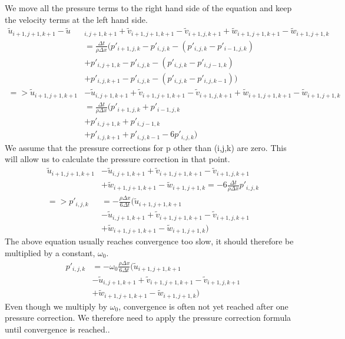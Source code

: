 \documentclass{article}
\begin{document}
We move all the pressure terms to the right hand side of the equation and keep the velocity terms at the left hand side.
\[
  \begin{split}
    \tilde{u}_{i+1,j+1,k+1}-\tilde{u}&_{i, j+1, k+1}
    +\tilde{v}_{i+1,j+1,k+1}-\tilde{v}_{i+1, j, k+1}
    +\tilde{w}_{i+1,j+1,k+1}
    -\tilde{w}_{i+1, j+1, k}\\
    &=\frac{\Delta t}{\rho \Delta x}(p'_{i+1,j,k}-p'_{i,j,k} - (p'_{i,j,k}-p'_{i-1,j,k})\\
    &+p'_{i,j+1,k}-p'_{i,j,k}-(p'_{i,j,k}-p'_{i,j-1,k})\\
    &+p'_{i,j,k+1}-p'_{i,j,k}- (p'_{i,j,k}-p'_{i,j,k-1}))\\
    =>\tilde{u}_{i+1,j+1,k+1}&-\tilde{u}_{i, j+1, k+1}
    +\tilde{v}_{i+1,j+1,k+1}-\tilde{v}_{i+1, j, k+1}
    +\tilde{w}_{i+1,j+1,k+1}
    -\tilde{w}_{i+1, j+1, k}\\
    &=\frac{\Delta t}{\rho \Delta x}(p'_{i+1,j,k} + p'_{i-1,j,k}\\
    &+p'_{i,j+1,k}+p'_{i,j-1,k}\\
    &+p'_{i,j,k+1}+p'_{i,j,k-1} - 6 p'_{i,j,k})
  \end{split}
\]
We assume that the pressure corrections for p other than (i,j,k) are zero. This will allow us to calculate the pressure correction in that point.\cite{MAC}
\[
  \begin{split}
  \tilde{u}_{i+1,j+1,k+1}&-\tilde{u}_{i, j+1, k+1}
    +\tilde{v}_{i+1,j+1,k+1}-\tilde{v}_{i+1, j, k+1}
    \\ &+\tilde{w}_{i+1,j+1,k+1}
    -\tilde{w}_{i+1, j+1, k}
     =-6\frac{\Delta t}{\rho \Delta x}p'_{i,j,k}\\
      =>p'_{i,j,k}&=-\frac{\rho \Delta x}{6\Delta t}(\tilde{u}_{i+1,j+1,k+1} \\ &-\tilde{u}_{i, j+1, k+1}
    +\tilde{v}_{i+1,j+1,k+1}-\tilde{v}_{i+1, j, k+1}
    \\ &+\tilde{w}_{i+1,j+1,k+1}
    -\tilde{w}_{i+1, j+1, k})
  \end{split}
\]
The above equation usually reaches convergence too slow, it should therefore be multiplied by a constant, \(\omega _0\).
\begin{equation}
\begin{split}
  p'_{i,j,k}&=-\omega _0\frac{\rho \Delta x}{6\Delta t}(\tilde{u}_{i+1,j+1,k+1}
  \\ &-\tilde{u}_{i, j+1, k+1}
  +\tilde{v}_{i+1,j+1,k+1}-\tilde{v}_{i+1, j, k+1}
  \\ &+\tilde{w}_{i+1,j+1,k+1}
  -\tilde{w}_{i+1, j+1, k})
\end{split} \label{pressure correction formula}
\end{equation}
Even though we multiply by \(\omega _0\), convergence is often not yet reached after one pressure correction. We therefore need to apply the pressure correction formula until convergence is reached.\cite{MAC}. 
\end{document}
